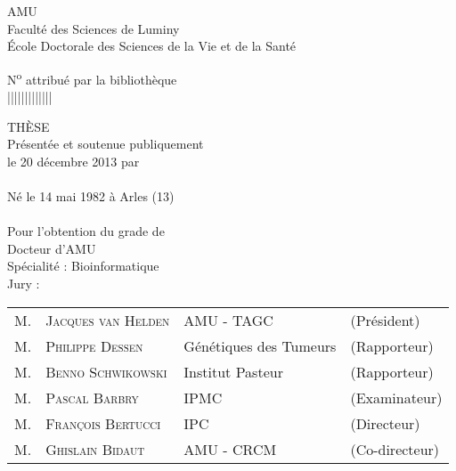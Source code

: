 \thispagestyle{empty}
	\begin{center}
		\avantgarLarge \acl{AMU}\\[1ex]
		\avantgar Faculté des Sciences de Luminy\\[1ex]
		\avantgar École Doctorale des Sciences de la Vie et de la Santé\\[3ex]
	\end{center}

	\begin{flushright}
		\avantgar N\textsuperscript{o} attribué par la bibliothèque\\[1ex]
		\avantgar |\textunderscore|\textunderscore|\textunderscore|\textunderscore|\textunderscore|\textunderscore|\textunderscore|\textunderscore|\textunderscore|\textunderscore|\textunderscore|\textunderscore|\\[1ex]
	\end{flushright}

	\begin{center}
		\avantgarboldHuge THÈSE\\[1.5ex]

		\avantgarlarge Présentée et soutenue publiquement\\[1ex]
		\avantgarlarge le 20 décembre 2013 par\\[1ex]
		\avantgarLarge \myauthor\\[1ex]
		\avantgar Né le 14 mai 1982 à Arles (13)\\[5ex]

		\avantgarboldHuge \mytitlefr\\[2ex]

		\avantgarlarge Pour l'obtention du grade de\\[1ex]
		\avantgarLarge Docteur d'\acl{AMU}\\[1ex]
		\avantgarlarge Spécialité : Bioinformatique\\[5ex]

		\avantgarlarge Jury :\\[1ex]
		\begin{tabular}{llll}
			{\Large M.} & {\Large\textsc{Jacques van Helden}}  & {\large \acs{AMU} - \acs{TAGC}}  & {\large(Président)}		\\
			{\Large M.} & {\Large\textsc{Philippe Dessen}}     & {\large Génétiques des Tumeurs}  & {\large(Rapporteur)}	\\
			{\Large M.} & {\Large\textsc{Benno Schwikowski}}   & {\large Institut Pasteur}        & {\large(Rapporteur)}	\\
			{\Large M.} & {\Large\textsc{Pascal Barbry}}       & {\large \acs{IPMC}}              & {\large(Examinateur)}	\\
			{\Large M.} & {\Large\textsc{François Bertucci}}   & {\large \acs{IPC}}               & {\large(Directeur)}		\\
			{\Large M.} & {\Large\textsc{Ghislain Bidaut}}     & {\large \acs{AMU} - \acs{CRCM}}  & {\large(Co-directeur)}	\\
		\end{tabular}
	\end{center}
